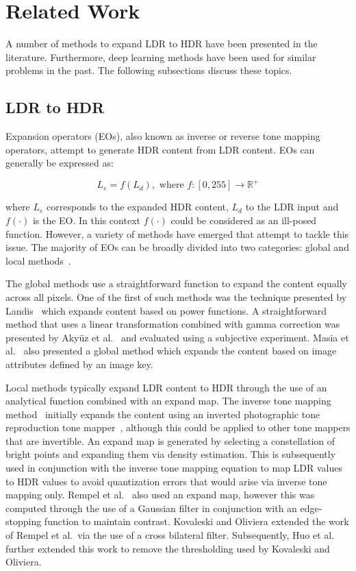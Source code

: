 \documentclass{egpubl}
\begin{document}
\section{\textbf{Related Work}}

A number of methods to expand LDR to HDR have been presented in the literature. Furthermore, deep learning methods have been used for similar
problems in the past. The following subsections discuss these topics.

\subsection{\textbf{LDR to HDR}}
Expansion operators (EOs), also known as inverse or reverse tone mapping operators, attempt to generate HDR content from LDR content. EOs can
generally be expressed as:

\begin{equation}
L_e = f(L_d), \text{ where } f:  [0,255] \to \mathbb{R}^{+}
\label{eqn:eo}
\end{equation}

\noindent where $L_e$ corresponds to the expanded HDR content, $L_d$ to the LDR input and $f(\cdot)$ is the EO. In this context $f(\cdot)$ could be
considered as an ill-posed function. However, a variety of methods have emerged that attempt to tackle this issue. The majority of EOs can be broadly
divided into two categories: global and local methods~\cite{banterle2011hdrbook}.

The global methods use a straightforward function to expand the content equally
across all pixels. One of the first of such methods was the technique presented
by Landis~\cite{Landis02} which expands content based on power functions. A
straightforward method that uses a linear transformation combined with gamma
correction was presented by Aky\"{u}z et al.~\cite{akyuz06} and evaluated using
a subjective experiment. Masia et al.~\cite{masia09,masia2017dynamic} also
presented a global method which expands the content based on image attributes
defined by an image key.

Local methods typically expand LDR content to HDR through the use of an
analytical function combined with an expand map. The inverse tone mapping
method~\cite{banterle06inverse} initially expands the content using an inverted
photographic tone reproduction tone mapper~\cite{reinhard2002tmo}, although this could be applied to other tone
mappers that are invertible. An expand map is generated by selecting a constellation of bright
points and expanding them via density estimation. This is subsequently used in
conjunction with the inverse tone mapping equation to map LDR values to HDR
values to avoid quantization errors that would arise via inverse tone mapping
only. Rempel et al.~\cite{rempel06ldr2hdr} also used an expand map, however
this was computed through the use of a Gaussian filter in conjunction with an
edge-stopping function to maintain contrast. Kovaleski and Oliviera
\cite{Kovaleski+2014} extended the work of Rempel et al.\ via the use of a cross
bilateral filter. Subsequently, Huo et al.~\cite{Huo+2014} further extended
this work to remove the thresholding used by Kovaleski and Oliviera.
\end{document}
